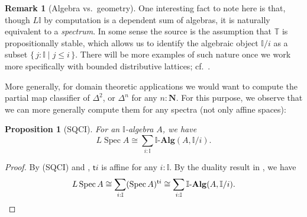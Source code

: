 \documentclass[a4paper,12pt]{amsart}
\newtheorem{proposition}[theorem]{Proposition}
\theoremstyle{definition}
\newtheorem{remark}[theorem]{Remark}
\newtheorem*{axiom}{Axiom}
\newcommand{\mb}[1]{\mathbf{#1}}
\newcommand{\mbb}[1]{\mathbb{#1}}
\newcommand{\T}{\mbb T}
\newcommand{\I}{\mbb I}
\newcommand{\ms}[1]{\mathsf{#1}}
\newcommand{\alg}{\text{-}\mb{Alg}}
\newcommand{\scomp}[2]{\{\,#1\mid#2\,\}}
\newcommand{\N}{\mb N}
\newcommand{\spec}{\operatorname{Spec}}
\begin{document}
\begin{remark}[Algebra vs.\ geometry]\label{rem:alggeoI}
  One interesting fact to note here is that, though $L\I$ by computation is a dependent sum of algebras, it is naturally equivalent to a \emph{spectrum}. In some sense the source is the assumption that $\T$ is propositionally stable, which allows us to identify the algebraic object $\I/i$ as a subset $\scomp{j : \I}{j \le i}$. There will be more examples of such nature once we work more specifically with bounded distributive lattices; cf.\ .
\end{remark}

More generally, for domain theoretic applications we would want to compute the partial map classifier of $\Delta^2$, or $\Delta^n$ for any $n:\N$. For this purpose, we observe that we can more generally compute them for any spectra (not only affine spaces):

\begin{proposition}[SQCI]\label{prop:liftofaffine}
  For an $\I$-algebra $A$, we have
  \[ L\spec A \cong \sum_{i:\I}\I\alg(A,\I/i). \]
\end{proposition}
\begin{proof}
  By (SQCI) and , $\ms ti$ is affine for any $i:\I$. By the duality result in , we have
  \[ L\spec A \cong \sum_{i:\I}(\spec A)^{\ms ti}\cong \sum_{i:\I}\I\alg(A,\I/i). \qedhere \]
\end{proof}




\end{document}
